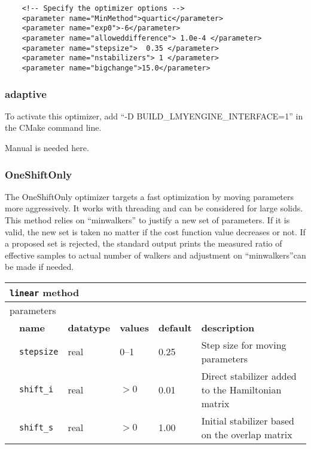 \begin{lstlisting}
    <!-- Specify the optimizer options -->
    <parameter name="MinMethod">quartic</parameter>
    <parameter name="exp0">-6</parameter>
    <parameter name="alloweddifference"> 1.0e-4 </parameter>
    <parameter name="stepsize">  0.35 </parameter>
    <parameter name="nstabilizers"> 1 </parameter>
    <parameter name="bigchange">15.0</parameter>
\end{lstlisting}

\subsubsection{adaptive}
To activate this optimizer, add ``-D BUILD\_LMYENGINE\_INTERFACE=1'' in the CMake command line.

Manual is needed here.

\subsubsection{OneShiftOnly}
The OneShiftOnly optimizer targets a fast optimization by moving parameters more aggressively. It works with threading and can be considered for large solids.
This method relies on ``minwalkers'' to justify a new set of parameters. If it is valid, the new set is taken no matter if the cost function value decreases or not.
If a proposed set is rejected, the standard output prints the measured ratio of effective samples to actual number of walkers and adjustment on ``minwalkers''can be made if needed.

\begin{table}[h]
\begin{center}
\begin{tabularx}{\textwidth}{l l l l l l }
\hline
\multicolumn{6}{l}{\texttt{linear} method} \\
\hline
\multicolumn{2}{l}{parameters}  & \multicolumn{4}{l}{}\\
   &   \bfseries name     & \bfseries datatype & \bfseries values & \bfseries default   & \bfseries description \\
   &   \texttt{stepsize} &  real     & 0--1 & 0.25  & Step size for moving parameters\\
   &   \texttt{shift\_i} &  real     & $>0$ & 0.01 & Direct stabilizer added to the Hamiltonian matrix\\
   &   \texttt{shift\_s} &  real     & $>0$ & 1.00 & Initial stabilizer based on the overlap matrix\\
  \hline
\end{tabularx}
\end{center}
\end{table}

